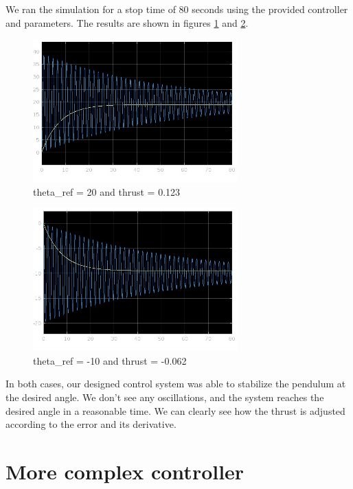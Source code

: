 \documentclass[12pt]{article}
\begin{document}
We ran the simulation for a stop time of 80 seconds using the provided controller and parameters. The results are shown in figures \ref{fig:simulation1} and \ref{fig:simulation2}. 

\begin{figure}[h!]
    \centering
    \includegraphics[width=0.7\textwidth]{simulation1.jpg}
    \caption{theta\_ref = 20 and thrust = 0.123}
    \label{fig:simulation1}
\end{figure}

\begin{figure}[h!]
    \centering
    \includegraphics[width=0.7\textwidth]{simulation2.jpg}
    \caption{theta\_ref = -10 and thrust = -0.062}
    \label{fig:simulation2}
\end{figure}

In both cases, our designed control system was able to stabilize the pendulum at the desired angle. We don't see any oscillations, and the system reaches the desired angle in a reasonable time. We can clearly see how the thrust is adjusted according to the error and its derivative. 

\section{More complex controller}
\end{document}
